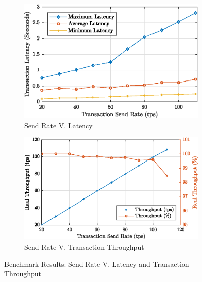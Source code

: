 \begin{figure}[htbp]
\centering
\begin{subfigure}{0.7\columnwidth}
\includegraphics[width=\columnwidth]{Figures/ICC-latency.eps}%
\caption{Send Rate V. Latency}%
\label{fig_latency}%
\end{subfigure}\hfill%
\begin{subfigure}{0.7\columnwidth}
\includegraphics[width=\columnwidth]{Figures/ICC-tps.eps}%
\caption{Send Rate V. Transaction Throughput}
\label{fig_TPS}
\end{subfigure}\hfill%
\caption{Benchmark Results: Send Rate V. Latency and Transaction Throughput}
\label{fig_results}%
\end{figure}


